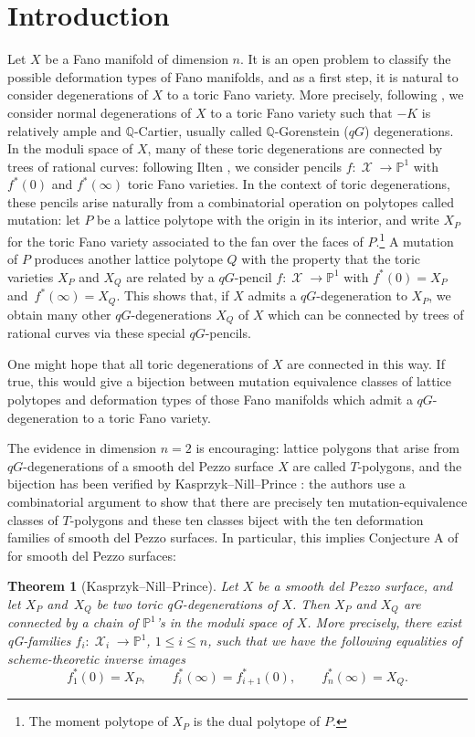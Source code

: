 \documentclass[pdftex]{sigma}
\numberwithin{equation}{section}
\newtheorem{Theorem}{Theorem}[section]
\DeclareMathOperator{\cX}{\mathcal{X}}
\newcommand{\PP}{\mathbb{P}}
\newcommand{\QQ}{\mathbb{Q}}
\begin{document}
\section{Introduction}
Let $X$ be a Fano manifold of dimension $n$. It is an open problem to classify the possible deformation types of Fano manifolds, and as a first step, it is natural to consider degenerations of $X$ to a toric Fano variety. More precisely, following \cite{AkhtarCoatesCorti}, we consider normal degenerations of $X$ to a toric Fano variety such that $-K$ is relatively ample and $\QQ$-Cartier, usually called $\QQ$-Gorenstein ($qG$) degenerations.
In the moduli space of $X$, many of these toric degenerations are connected by trees of rational curves: following Ilten \cite{Ilten}, we consider pencils $f \colon \cX \rightarrow \PP^1$ with $f^*(0)$ and $f^*(\infty)$ toric Fano varieties. In the context of toric degenerations, these pencils arise naturally from a combinatorial operation on polytopes called mutation: let $P$ be a lattice polytope with the origin in its interior, and write $X_P$ for the toric Fano variety associated to the fan over the faces of $P$.\footnote{The moment polytope of $X_P$ is the dual polytope of $P$.} A mutation of $P$ produces another lattice polytope $Q$ with the property that the toric varieties $X_P$ and $X_Q$ are related by a $qG$-pencil $f \colon \cX \rightarrow \PP^1$ with $f^*(0)=X_P$ and~${f^*(\infty)=X_Q}$.
This shows that, if $X$ admits a $qG$-degeneration to $X_P$, we obtain many other $qG$-degenerations $X_Q$ of $X$ which can be connected by trees of rational curves via these special $qG$-pencils.

One might hope that all toric degenerations of $X$ are connected in this way. If true, this would give a bijection between mutation equivalence classes of lattice polytopes and deformation types of those Fano manifolds which admit a $qG$-degeneration to a toric Fano variety.

The evidence in dimension $n=2$ is encouraging: lattice polygons that arise from $qG$-degenerations of a smooth del Pezzo surface $X$ are called $T$-polygons, and the bijection has been verified by Kasprzyk--Nill--Prince \cite{KasprzykNillPrince}: the authors use a combinatorial argument to show that there are precisely ten mutation-equivalence classes of $T$-polygons and these ten classes biject with the ten deformation families of smooth del Pezzo surfaces. In particular, this implies Conjecture A of \cite{AkhtarCoatesCorti} for smooth del Pezzo surfaces:
\begin{Theorem}[Kasprzyk--Nill--Prince]\label{thm:main}
		Let $X$ be a smooth del Pezzo surface, and let $X_P$ and~$X_Q$ be two toric qG-degenerations of $X$. Then $X_P$ and $X_Q$ are connected by a chain of $\PP^1$'s in the moduli space of $X$. More precisely, there exist
		qG-families $f_i \colon \cX_i \rightarrow \PP^1$, $1 \leq i \leq n$,
		such that we have the following equalities of scheme-theoretic inverse images
		\[
		f^*_1(0)=X_P, \qquad f^*_i(\infty)=f_{i+1}^*(0), \qquad f_n^*(\infty)=X_Q.
		\]
\end{Theorem}
\end{document}
